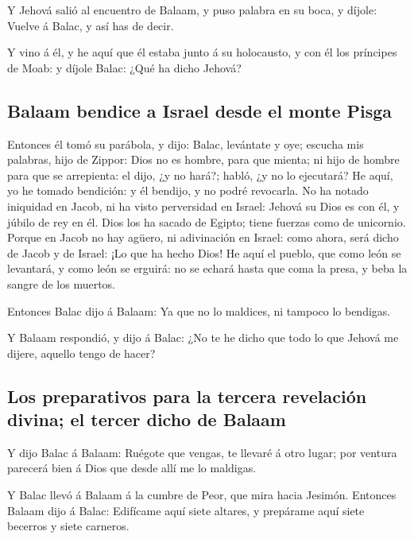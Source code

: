  Y Jehová salió al encuentro de Balaam, y puso palabra en
su boca, y díjole: Vuelve á Balac, y así has de decir.

 Y vino á él, y he aquí que él estaba junto á su
holocausto, y con él los príncipes de Moab: y díjole Balac: ¿Qué ha
dicho Jehová?

\hypertarget{balaam-bendice-a-israel-desde-el-monte-pisga}{%
\subsection{Balaam bendice a Israel desde el monte
Pisga}\label{balaam-bendice-a-israel-desde-el-monte-pisga}}

 Entonces él tomó su parábola, y dijo: Balac, levántate y
oye; escucha mis palabras, hijo de Zippor:  Dios no es
hombre, para que mienta; ni hijo de hombre para que se arrepienta: el
dijo, ¿y no hará?; habló, ¿y no lo ejecutará?  He aquí, yo
he tomado bendición: y él bendijo, y no podré revocarla. 
No ha notado iniquidad en Jacob, ni ha visto perversidad en Israel:
Jehová su Dios es con él, y júbilo de rey en él.  Dios los
ha sacado de Egipto; tiene fuerzas como de unicornio. 
Porque en Jacob no hay agüero, ni adivinación en Israel: como ahora,
será dicho de Jacob y de Israel: ¡Lo que ha hecho Dios!  He
aquí el pueblo, que como león se levantará, y como león se erguirá: no
se echará hasta que coma la presa, y beba la sangre de los muertos.

 Entonces Balac dijo á Balaam: Ya que no lo maldices, ni
tampoco lo bendigas.

 Y Balaam respondió, y dijo á Balac: ¿No te he dicho que
todo lo que Jehová me dijere, aquello tengo de hacer?

\hypertarget{los-preparativos-para-la-tercera-revelaciuxf3n-divina-el-tercer-dicho-de-balaam}{%
\subsection{Los preparativos para la tercera revelación divina; el
tercer dicho de
Balaam}\label{los-preparativos-para-la-tercera-revelaciuxf3n-divina-el-tercer-dicho-de-balaam}}

 Y dijo Balac á Balaam: Ruégote que vengas, te llevaré á
otro lugar; por ventura parecerá bien á Dios que desde allí me lo
maldigas.

 Y Balac llevó á Balaam á la cumbre de Peor, que mira hacia
Jesimón.  Entonces Balaam dijo á Balac: Edifícame aquí
siete altares, y prepárame aquí siete becerros y siete carneros.

